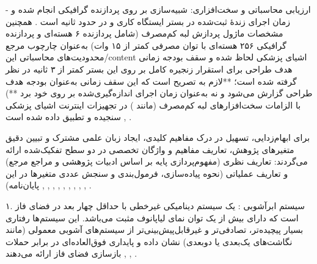 {-} ارزیابی محاسباتی و سخت‌افزاری: شبیه‌سازی بر روی پردازنده گرافیکی  انجام شده و زمان اجرای زندهٔ ثبت‌شده در بستر ایستگاه کاری و  در حدود  ثانیه است . همچنین مشخصات ماژول پردازش لبه کم‌مصرف  (شامل پردازنده ۶ هسته‌ای  و پردازنده گرافیکی ۲۵۶ هسته‌ای  با توان مصرفی کمتر از ۱۵ وات) به‌عنوان چارچوب مرجع محدودیت‌های محاسباتی این/content اشیای پزشکی  لحاظ شده و سقف بودجه زمانی هدف طراحی برای استقرار زنجیره کامل بر روی این بستر کمتر از ۳ ثانیه در نظر گرفته شده است؛ **لازم به تصریح است که این سقف زمانی به‌عنوان بودجه هدف طراحی گزارش می‌شود و نه به‌عنوان زمان اجرای اندازه‌گیری‌شده بر روی خود برد **) با الزامات سخت‌افزارهای لبه کم‌مصرف (مانند ) در تجهیزات اینترنت اشیای پزشکی  سنجیده و تطبیق داده شده است , .\par





برای ابهام‌زدایی، تسهیل در درک مفاهیم کلیدی، ایجاد زبان علمی مشترک و تبیین دقیق متغیرهای پژوهش، تعاریف مفاهیم و واژگان تخصصی در دو سطح تفکیک‌شده ارائه می‌گردند: تعاریف نظری (مفهوم‌پردازی پایه بر اساس ادبیات پژوهشی و مراجع مرجع) و تعاریف عملیاتی (نحوه پیاده‌سازی، فرمول‌بندی و سنجش عددی متغیرها در این پایان‌نامه) , , , , , , , , , .\par






۱. سیستم ابرآشوبی : یک سیستم دینامیکی غیرخطی با حداقل چهار بعد در فضای فاز است که دارای بیش از یک توان نمای لیاپانوف مثبت  می‌باشد. این سیستم‌ها رفتاری بسیار پیچیده‌تر، تصادفی‌تر و غیرقابل‌پیش‌بینی‌تر از سیستم‌های آشوبی معمولی (مانند نگاشت‌های یک‌بعدی یا دوبعدی) نشان داده و پایداری فوق‌العاده‌ای در برابر حملات بازسازی فضای فاز  ارائه می‌دهند , , .\par

